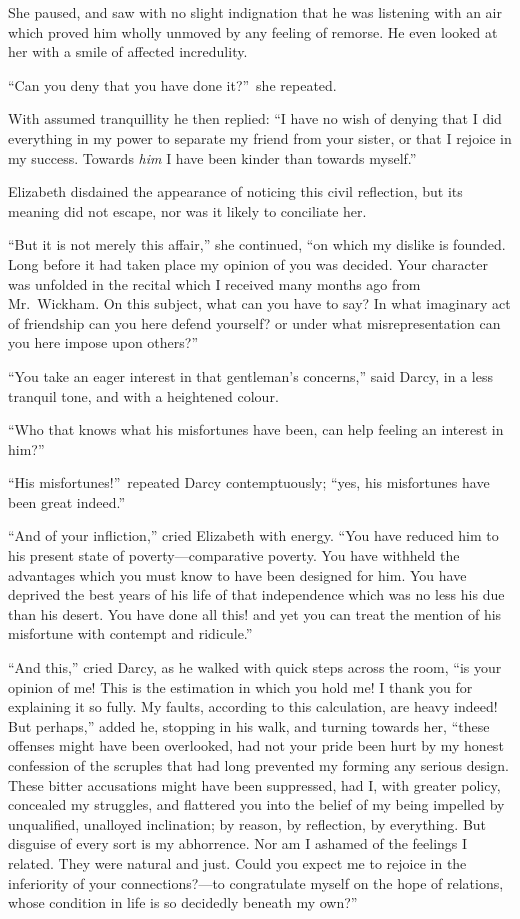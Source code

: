\documentclass[12pt,english,oneside]{book}
\begin{document}
She paused, and saw with no slight indignation that he was listening
with an air which proved him wholly unmoved by any feeling of remorse.
He even looked at her with a smile of affected incredulity.

{}``Can you deny that you have done it?''\ she repeated.

With assumed tranquillity he then replied: {}``I have no wish of
denying that I did everything in my power to separate my friend from
your sister, or that I rejoice in my success. Towards \textit{him}
I have been kinder than towards myself.''

Elizabeth disdained the appearance of noticing this civil reflection,
but its meaning did not escape, nor was it likely to conciliate her.

{}``But it is not merely this affair,'' she continued, {}``on which
my dislike is founded. Long before it had taken place my opinion of
you was decided. Your character was unfolded in the recital which
I received many months ago from Mr.\ Wickham. On this subject, what
can you have to say? In what imaginary act of friendship can you here
defend yourself? or under what misrepresentation can you here impose
upon others?''\ 

{}``You take an eager interest in that gentleman's concerns,'' said
Darcy, in a less tranquil tone, and with a heightened colour.

{}``Who that knows what his misfortunes have been, can help feeling
an interest in him?''\ 

{}``His misfortunes!''\ repeated Darcy contemptuously; {}``yes,
his misfortunes have been great indeed.''

{}``And of your infliction,'' cried Elizabeth with energy. {}``You
have reduced him to his present state of poverty\mbox{---}comparative
poverty. You have withheld the advantages which you must know to have
been designed for him. You have deprived the best years of his life
of that independence which was no less his due than his desert. You
have done all this! and yet you can treat the mention of his misfortune
with contempt and ridicule.''

{}``And this,'' cried Darcy, as he walked with quick steps across
the room, {}``is your opinion of me! This is the estimation in which
you hold me! I thank you for explaining it so fully. My faults, according
to this calculation, are heavy indeed! But perhaps,'' added he, stopping
in his walk, and turning towards her, {}``these offenses might have
been overlooked, had not your pride been hurt by my honest confession
of the scruples that had long prevented my forming any serious design.
These bitter accusations might have been suppressed, had I, with greater
policy, concealed my struggles, and flattered you into the belief
of my being impelled by unqualified, unalloyed inclination; by reason,
by reflection, by everything. But disguise of every sort is my abhorrence.
Nor am I ashamed of the feelings I related. They were natural and
just. Could you expect me to rejoice in the inferiority of your connections?\mbox{---}to
congratulate myself on the hope of relations, whose condition in life
is so decidedly beneath my own?''\ 
\end{document}
